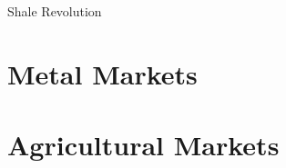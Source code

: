 \documentclass[10pt]{article}
\begin{document}
    \begin{core}{Shale Revolution}



    \end{core}

\section{Metal Markets}

\section{Agricultural Markets}
\end{document}
